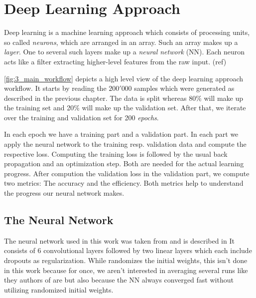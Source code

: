 
\section{Deep Learning Approach}

Deep learning is a machine learning approach which consists of processing
units, so called \textit{neurons}, which are arranged in an array. Such an array 
makes up a \textit{layer}. One to several such layers make up a
\textit{neural network} (NN). Each neuron
acts like a filter extracting higher-level features from the raw input. (ref)

\autoref{fig:3_main_workflow} depicts a high level view of the deep learning approach workflow.
It starts by reading the $200'000$ samples which were generated as described in
the previous chapter. The data is split whereas 80\% will make up the
training set and 20\% will make up the validation set.
After that, we iterate over the training and validation set for 200 
\textit{epochs}. 

In each epoch we have a training part and a validation part. In each
part we apply the neural network to the training resp. validation data and
compute the respective loss. Computing the training loss is followed by the
usual back propagation and an optimization step. Both are needed for the actual
learning progress. After compution the validation loss in the validation part,
we compute two metrics: The accuracy and the efficiency. Both metrics help
to understand the progress our neural network makes.



\newpage

\subsection{The Neural Network}
The neural network used in this work was taken from \cite{PhysRevD.105.043002}
and is described in
It consists of 6 convolutional layers followed by two linear layers which each include
dropouts as regularization. While \cite{PhysRevD.105.043002} randomizes the 
initial weights, this isn't done in this work because for once, we aren't
interested in averaging several runs like they authors of \cite{PhysRevD.105.043002}
are but also because the NN always converged fast without utilizing randomized
initial weights.


